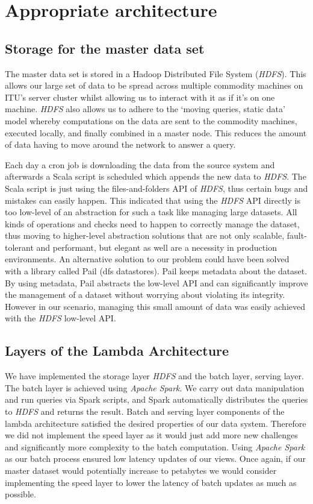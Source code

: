 \documentclass[format=acmsmall, review=false, screen=true]{acmart}
\begin{document}
\section{Appropriate architecture}

\subsection{Storage for the master data set}
The master data set is stored in a Hadoop Distributed File System (\textit{HDFS}). This allows our large set of data to be spread across multiple commodity machines on ITU’s server cluster whilst allowing us to interact with it as if it’s on one machine. \textit{HDFS} also allows us to adhere to the ‘moving queries, static data’ model whereby computations on the data are sent to the commodity machines, executed locally, and finally combined in a master node. This reduces the amount of data having to move around the network to answer a query.

Each day a cron job is downloading the data from the source system and afterwards a Scala script is scheduled which appends the new data to \textit{HDFS}. The Scala script is just using the files-and-folders API of \textit{HDFS}, thus certain bugs and mistakes can easily happen. This indicated that using the \textit{HDFS} API directly is too low-level of an abstraction for such a task like managing large datasets. All kinds of operations and checks need to happen to correctly manage the dataset, thus moving to higher-level abstraction solutions that are not only scalable, fault-tolerant and performant, but elegant as well are a necessity in production environments. An alternative solution to our problem could have been solved with a library called Pail (dfs datastores). Pail keeps metadata about the dataset. By using metadata, Pail abstracts the low-level API and can significantly improve the management of a dataset without worrying about violating its integrity. However in our scenario, managing this small amount of data was easily achieved with the \textit{HDFS} low-level API.

\subsection{Layers of the Lambda Architecture}

We have implemented the storage layer \textit{HDFS} and the batch layer, serving layer. The batch layer is achieved using \textit{Apache Spark}. We carry out data manipulation and run queries via Spark scripts, and Spark automatically distributes the queries to \textit{HDFS} and returns the result. Batch and serving layer components of the lambda architecture satisfied the desired properties of our data system. Therefore we did not implement the speed layer as it would just add more new challenges and significantly more complexity to the batch computation. Using \textit{Apache Spark} as our batch process ensured low latency updates of our views. Once again, if our master dataset would potentially increase to petabytes we would consider implementing the speed layer to lower the latency of batch updates as much as possible.
\end{document}

